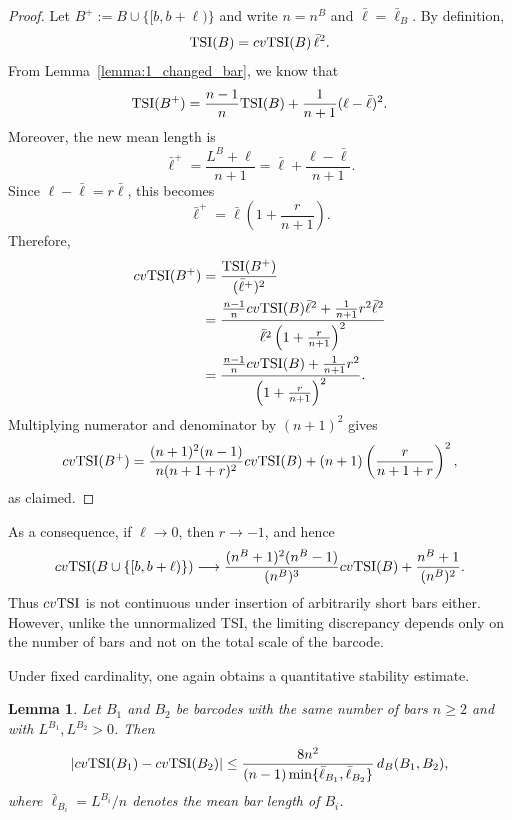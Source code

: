 \documentclass[11pt]{amsart}
\newtheorem{lemma}[theorem]{Lemma}
\theoremstyle{definition}
\newcommand{\tsi}[0]{\textup{TSI}}
\begin{document}
\begin{proof}
Let $B^+:=B\cup\{[b,b+\ell)\}$ and write $n=n^B$ and $\bar\ell=\bar{\ell}_B$. By definition,
\[
\tsi(B)=cv\tsi(B)\,\bar\ell^2.
\]
From Lemma~\ref{lemma:1_changed_bar}, we know that
\[
\tsi(B^+)
=
\frac{n-1}{n}\tsi(B)
+
\frac{1}{n+1}(\ell-\bar\ell)^2.
\]
Moreover, the new mean length is
\[
\bar\ell^+
=
\frac{L^B+\ell}{n+1}
=
\bar\ell+\frac{\ell-\bar\ell}{n+1}.
\]
Since $\ell-\bar\ell=r\bar\ell$, this becomes
\[
\bar\ell^+
=
\bar\ell\left(1+\frac{r}{n+1}\right).
\]
Therefore,
\begin{align*}
cv\tsi(B^+)
&=
\frac{\tsi(B^+)}{(\bar\ell^+)^2}\\
&=
\frac{\frac{n-1}{n}cv\tsi(B)\bar\ell^2+\frac{1}{n+1}r^2\bar\ell^2}
{\bar\ell^2\left(1+\frac{r}{n+1}\right)^2}\\
&=
\frac{\frac{n-1}{n}cv\tsi(B)+\frac{1}{n+1}r^2}
{\left(1+\frac{r}{n+1}\right)^2}.
\end{align*}
Multiplying numerator and denominator by $(n+1)^2$ gives
\[
cv\tsi(B^+)
=
\frac{(n+1)^2(n-1)}{n(n+1+r)^2}cv\tsi(B)
+
(n+1)\left(\frac{r}{n+1+r}\right)^2,
\]
as claimed.
\end{proof}

As a consequence, if $\ell\to 0$, then $r\to -1$, and hence
\begin{equation}
cv\tsi(B\cup\{[b,b+\ell)\})
\longrightarrow
\frac{(n^B+1)^2(n^B-1)}{(n^B)^3}cv\tsi(B)
+
\frac{n^B+1}{(n^B)^2}.
\end{equation}
Thus $cv\tsi$ is not continuous under insertion of arbitrarily short bars either. However, unlike the unnormalized TSI, the limiting discrepancy depends only on the number of bars and not on the total scale of the barcode.

Under fixed cardinality, one again obtains a quantitative stability estimate.

\begin{lemma}\label{lemma:cvtsi_stability}
Let $B_1$ and $B_2$ be barcodes with the same number of bars $n\geq 2$ and with $L^{B_1},L^{B_2}>0$. Then
\begin{equation}
|cv\tsi(B_1)-cv\tsi(B_2)|
\leq
\frac{8n^2}{(n-1)\min\{\bar{\ell}_{B_1},\bar{\ell}_{B_2}\}}\,d_B(B_1,B_2),
\end{equation}
where $\bar{\ell}_{B_i}=L^{B_i}/n$ denotes the mean bar length of $B_i$.
\end{lemma}
\end{document}
